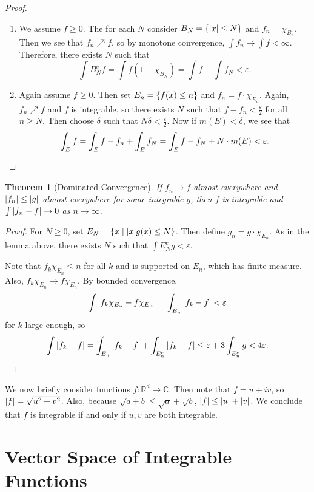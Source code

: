 \documentclass[leqno, openany]{memoir}
\newtheorem{thm}{Theorem}[chapter]
\theoremstyle{definition}
\theoremstyle{remark}
\theoremstyle{plain}
\theoremstyle{definition}
\theoremstyle{remark}
\newcommand{\R}{\mathbb{R}}
\newcommand{\C}{\mathbb{C}}
\newcommand{\ep}{\varepsilon}
\begin{document}
\begin{proof}
    \begin{enumerate}
        \item We assume $f \geq 0$. The for each $N$ consider $B_N = \qty{\abs{x} \leq N}$ and $f_n = \chi_{B_n}$. Then we see that $f_n \nearrow f$, so by monotone convergence, $\int f_n \to \int f < \infty$. Therefore, there exists $N$ such that
            \[ \int B_N^c f = \int f(1-\chi_{B_N}) = \int f - \int f_N < \ep. \]
        \item Again assume $f \geq 0$. Then set $E_n = \qty{f(x) \leq n}$ and $f_n = f \cdot \chi_{E_n}$. Again, $f_n \nearrow f$ and $f$ is integrable, so there exists $N$ such that $f- f_n < \frac{\ep}{2}$ for all $n \geq N$. Then choose $\delta$ such that $N \delta < \frac{\ep}{2}$. Now if $m(E) < \delta$, we see that
            \[ \int_E f = \int_E f-f_n + \int_E f_N = \int_E f-f_N + N \cdot m(E) < \ep. \qedhere \]
    \end{enumerate}
\end{proof}

\begin{thm}[Dominated Convergence]
    If $f_n \to f$ almost everywhere and $\abs{f_n} \leq \abs{g}$ almost everywhere for some integrable $g$, then $f$ is integrable and $\int \abs{f_n - f} \to 0$ as $n \to \infty$.
\end{thm}

\begin{proof}
    For $N \geq 0$, set $E_N = \qty{ x \mid \abs{x} g(x) \leq N }$. Then define $g_n = g \cdot \chi_{E_n}$. As in the lemma above, there exists $N$ such that $\int E_N^c g < \ep$.

    Note that $f_k \chi_{E_n} \leq n$ for all $k$ and is supported on $E_n$, which has finite measure. Also, $f_k \chi_{E_n} \to f \chi_{E_n}$. By bounded convergence, 
    \[ \int \abs{f_k \chi_{E_n} - f \chi_{E_n}} = \int_{E_n} \abs{f_k - f} < \ep \]
    for $k$ large enough, so
    \[ \int \abs{f_k - f} = \int_{E_n} \abs{f_k - f} + \int_{E_n^c} \abs{f_k - f} \leq \ep + 3 \int_{E_n^c} g < 4 \ep. \qedhere \]
\end{proof}

We now briefly consider functions $f: \R^d \to \C$. Then note that $f = u+iv$, so $\abs{f} = \sqrt{u^2 + v^2}$. Also, because $\sqrt{a+b} \leq \sqrt{a} + \sqrt{b}$, $\abs{f} \leq \abs{u} + \abs{v}$. We conclude that $f$ is integrable if and only if $u,v$ are both integrable.

\section{Vector Space of Integrable Functions}%
\label{sec:vector_space_of_integrable_functions}
\end{document}
